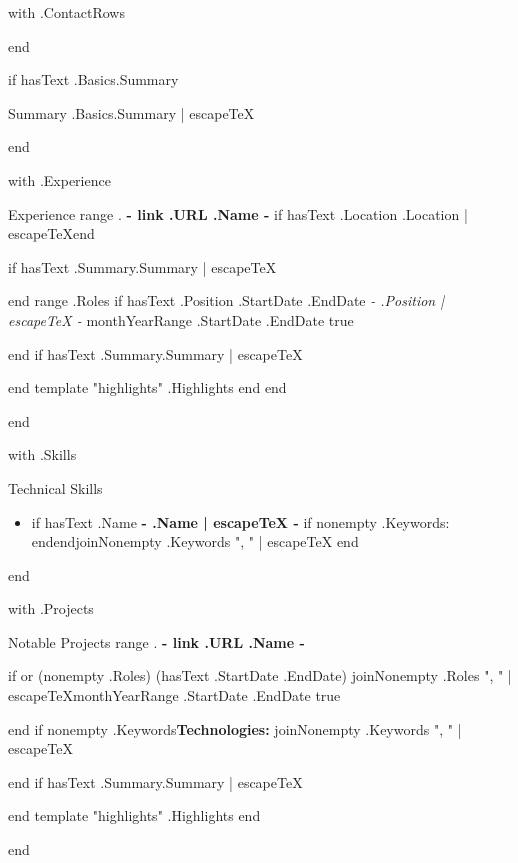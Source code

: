 {{with .ContactRows}}
\vspace{0.25em}
{{end}}

{{if hasText .Basics.Summary}}
\begin{resumesection}{Summary}
{{.Basics.Summary | escapeTeX}}
\end{resumesection}
{{end}}

{{with .Experience}}
\begin{resumesection}{Experience}
{{range .}}
\textbf{ {{- link .URL .Name -}} }{{if hasText .Location}} \hfill {{.Location | escapeTeX}}{{end}}\par
{{if hasText .Summary}}{{.Summary | escapeTeX}}\par{{end}}
{{range .Roles}}
{{if hasText .Position .StartDate .EndDate}}
\textit{ {{- .Position | escapeTeX -}} } \hfill {{monthYearRange .StartDate .EndDate true}}\par
{{end}}
{{if hasText .Summary}}{{.Summary | escapeTeX}}\par{{end}}
{{template "highlights" .Highlights}}
{{end}}
{{end}}
\end{resumesection}
{{end}}

{{with .Skills}}
\begin{resumesection}{Technical Skills}
\begin{itemize}[label={}]
  {{range .}}\item {{if hasText .Name}}\textbf{ {{- .Name | escapeTeX -}} }{{if nonempty .Keywords}}: {{end}}{{end}}{{joinNonempty .Keywords ", " | escapeTeX}}
  {{end}}
\end{itemize}
\end{resumesection}
{{end}}

{{with .Projects}}
\begin{resumesection}{Notable Projects}
{{range .}}
\textbf{ {{- link .URL .Name -}} }\par
{{if or (nonempty .Roles) (hasText .StartDate .EndDate)}}
{{joinNonempty .Roles ", " | escapeTeX}}\hfill {{monthYearRange .StartDate .EndDate true}}\par
{{end}}
{{if nonempty .Keywords}}{\color{primary}\textbf{Technologies:} {{joinNonempty .Keywords ", " | escapeTeX}}}\par{{end}}
{{if hasText .Summary}}{{.Summary | escapeTeX}}\par{{end}}
{{template "highlights" .Highlights}}
{{end}}
\end{resumesection}
{{end}}

